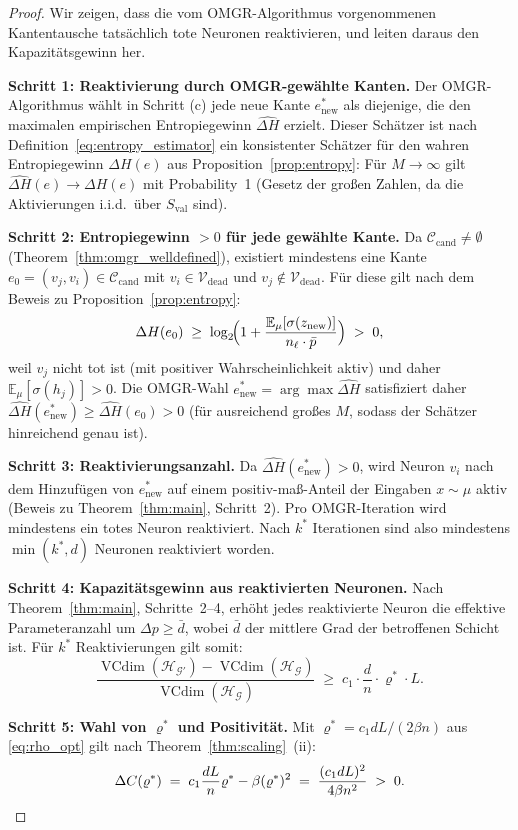 ﻿\documentclass[12pt, a4paper, openany]{report}
\newcommand{\E}{\mathbb{E}}
\newcommand{\calG}{\mathcal{G}}
\newcommand{\calH}{\mathcal{H}}
\newcommand{\calV}{\mathcal{V}}
\newcommand{\calC}{\mathcal{C}}
\DeclareMathOperator{\VC}{VCdim}
\begin{document}
\begin{proof}
Wir zeigen, dass die vom OMGR-Algorithmus vorgenommenen Kantentausche
tatsächlich tote Neuronen reaktivieren, und leiten daraus den
Kapazitätsgewinn her.

\textbf{Schritt 1: Reaktivierung durch OMGR-gewählte Kanten.}
Der OMGR-Algo\-rithmus wählt in Schritt (c) jede neue Kante $e_{\mathrm{new}}^*$
als diejenige, die den maximalen empirischen Entropiegewinn $\widehat{\Delta H}$
erzielt.  Dieser Schätzer ist nach Definition~\eqref{eq:entropy_estimator}
ein konsistenter Schätzer für den wahren Entropiegewinn $\Delta H(e)$
aus Proposition~\ref{prop:entropy}: Für $M \to \infty$ gilt
$\widehat{\Delta H}(e) \to \Delta H(e)$ mit Probability~1 (Gesetz der
großen Zahlen, da die Aktivierungen i.i.d.\ über $S_{\mathrm{val}}$ sind).

\textbf{Schritt 2: Entropiegewinn $>0$ für jede gewählte Kante.}
Da $\calC_{\mathrm{cand}} \neq \emptyset$ (Theorem~\ref{thm:omgr_welldefined}),
existiert mindestens eine Kante $e_0 = (v_j, v_i) \in \calC_{\mathrm{cand}}$
mit $v_i \in \calV_{\mathrm{dead}}$ und $v_j \notin \calV_{\mathrm{dead}}$.
Für diese gilt nach dem Beweis zu Proposition~\ref{prop:entropy}:
\[
  \Delta H(e_0) \;\geq\;
  \log_2\!\Bigl(1 + \frac{\E_\mu[\sigma(z_{\mathrm{new}})]}{n_\ell \cdot \bar p}\Bigr)
  \;>\; 0,
\]
weil $v_j$ nicht tot ist (mit positiver Wahrscheinlichkeit aktiv) und
daher $\E_\mu[\sigma(h_j)] > 0$.  Die OMGR-Wahl $e_{\mathrm{new}}^* = \arg\max \widehat{\Delta H}$
satisfiziert daher $\widehat{\Delta H}(e_{\mathrm{new}}^*) \geq \widehat{\Delta H}(e_0) > 0$
(für ausreichend großes $M$, sodass der Schätzer hinreichend genau ist).

\textbf{Schritt 3: Reaktivierungsanzahl.}
Da $\widehat{\Delta H}(e_{\mathrm{new}}^*) > 0$, wird Neuron $v_i$ nach dem
Hinzufügen von $e_{\mathrm{new}}^*$ auf einem positiv-maß-Anteil der
Eingaben $x \sim \mu$ aktiv (Beweis zu Theorem~\ref{thm:main}, Schritt~2).
Pro OMGR-Iteration wird mindestens ein totes Neuron reaktiviert.
Nach $k^*$ Iterationen sind also mindestens $\min(k^*, d)$ Neuronen
reaktiviert worden.

\textbf{Schritt 4: Kapazitätsgewinn aus reaktivierten Neuronen.}
Nach Theorem~\ref{thm:main}, Schritte~2--4, erhöht jedes reaktivierte
Neuron die effektive Parameteranzahl um $\Delta p \geq \bar{d}$,
wobei $\bar{d}$ der mittlere Grad der betroffenen Schicht ist.
Für $k^*$ Reaktivierungen gilt somit:
\[
  \frac{\VC(\calH_{\calG'}) - \VC(\calH_{\calG})}{\VC(\calH_{\calG})}
  \;\geq\;
  c_1 \cdot \frac{d}{n} \cdot \varrho^* \cdot L.
\]

\textbf{Schritt 5: Wahl von $\varrho^*$ und Positivität.}
Mit $\varrho^* = c_1 d L / (2\beta n)$ aus \eqref{eq:rho_opt} gilt nach
Theorem~\ref{thm:scaling}~(ii):
\[
  \Delta C(\varrho^*) \;=\;
  c_1 \frac{dL}{n} \varrho^* - \beta (\varrho^*)^2
  \;=\; \frac{(c_1 dL)^2}{4\beta n^2} \;>\; 0. \qedhere
\]
\end{proof}
\end{document}
